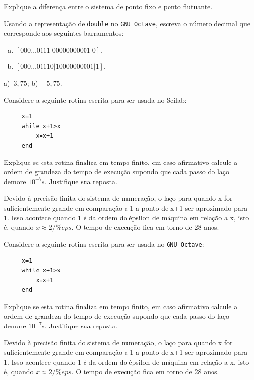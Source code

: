 \begin{exer}
  Explique a diferença entre o sistema de ponto fixo e ponto flutuante.
\end{exer}


\ifisoctave
\begin{exer}
  Usando a representação de \verb+double+ no \verb+GNU Octave+, escreva o número decimal que corresponde aos seguintes barramentos:
  \begin{enumerate}[a)]
  \item $[000\ldots 0111|00000000001|0]$.
  \item $[000\ldots 01110|10000000001|1]$.
  \end{enumerate}
\end{exer}
\begin{resp}
  a)~$3,75$; b)~$-5,75$.
\end{resp}
\fi


\ifisscilab
\begin{exer}Considere a seguinte rotina escrita para ser usada no Scilab:
 \begin{verbatim}
     x=1
     while x+1>x
         x=x+1
     end
 \end{verbatim}
 Explique se esta rotina finaliza em tempo finito, em caso afirmativo calcule a ordem de grandeza do tempo de execução supondo que cada passo do laço demore $10^{-7}s$. Justifique sua reposta.
 \end{exer}
\begin{resp}
 Devido à precisão finita do sistema de numeração, o laço para quando x for suficientemente grande em comparação a 1 a ponto de x+1 ser aproximado para 1. Isso acontece quando 1 é da ordem do épsilon de máquina em relação a x, isto é, quando $x\approx 2/\%eps$. O tempo de execução fica em torno de 28 anos.
\end{resp}

 \fi



\ifisoctave
\begin{exer}Considere a seguinte rotina escrita para ser usada no \verb+GNU Octave+:
 \begin{verbatim}
     x=1
     while x+1>x
         x=x+1
     end
 \end{verbatim}
 Explique se esta rotina finaliza em tempo finito, em caso afirmativo calcule a ordem de grandeza do tempo de execução supondo que cada passo do laço demore $10^{-7}s$. Justifique sua reposta.
 \end{exer}
\begin{resp}
 Devido à precisão finita do sistema de numeração, o laço para quando x for suficientemente grande em comparação a 1 a ponto de x+1 ser aproximado para 1. Isso acontece quando 1 é da ordem do épsilon de máquina em relação a x, isto é, quando $x\approx 2/\%eps$. O tempo de execução fica em torno de 28 anos.
\end{resp}
 \fi

